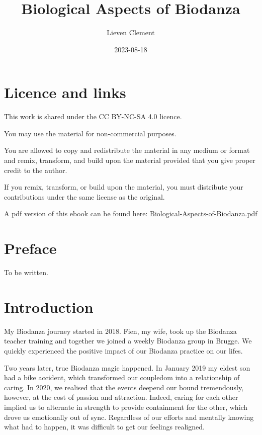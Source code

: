\documentclass[
  11pt,
]{book}
\title{Biological Aspects of Biodanza}
\author{Lieven Clement}
\date{2023-08-18}
\begin{document}
\maketitle

{
\hypersetup{linkcolor=}
\setcounter{tocdepth}{2}
\tableofcontents
}
\hypertarget{licence-and-links}{%
\chapter*{Licence and links}\label{licence-and-links}}

This work is shared under the CC BY-NC-SA 4.0 licence.

You may use the material for non-commercial purposes.

You are allowed to copy and redistribute the material in any medium or format and remix, transform, and build upon the material provided that you give proper credit to the author.

If you remix, transform, or build upon the material, you must distribute your contributions under the same license as the original.

A pdf version of this ebook can be found here: \href{https://biodanzabrugge.be/biologicalAspectsBiodanza/Biological-Aspects-of-Biodanza.pdf}{Biological-Aspects-of-Biodanza.pdf}

\hypertarget{preface}{%
\chapter*{Preface}\label{preface}}

To be written.

\hypertarget{intro}{%
\chapter{Introduction}\label{intro}}

My Biodanza journey started in 2018. Fien, my wife, took up the Biodanza teacher training and together we joined a weekly Biodanza group in Brugge. We quickly experienced the positive impact of our Biodanza practice on our lifes.

Two years later, true Biodanza magic happened.
In January 2019 my eldest son had a bike accident, which transformed our coupledom into a relationship of caring. In 2020, we realised that the events deepend our bound tremendously, however, at the cost of passion and attraction. Indeed, caring for each other implied us to alternate in strength to provide containment for the other, which drove us emotionally out of sync. Regardless of our efforts and mentally knowing what had to happen, it was difficult to get our feelings realigned.
\end{document}
